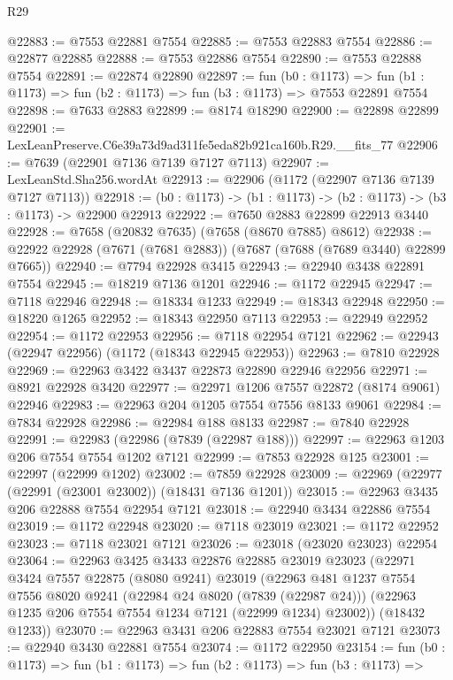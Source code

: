 \begin{lexlean}{R29}
\begin{coremodule}
@22883 := @7553 @22881 @7554
@22885 := @7553 @22883 @7554
@22886 := @22877 @22885
@22888 := @7553 @22886 @7554
@22890 := @7553 @22888 @7554
@22891 := @22874 @22890
@22897 := fun (b0 : @1173) =>
  fun (b1 : @1173) => fun (b2 : @1173) => fun (b3 : @1173) => @7553 @22891 @7554
@22898 := @7633 @2883
@22899 := @8174 @18290
@22900 := @22898 @22899
@22901 := LexLeanPreserve.C6e39a73d9ad311fe5eda82b921ca160b.R29.__fits_77
@22906 := @7639 (@22901 @7136 @7139 @7127 @7113)
@22907 := LexLeanStd.Sha256.wordAt
@22913 := @22906 (@1172 (@22907 @7136 @7139 @7127 @7113))
@22918 := (b0 : @1173) -> (b1 : @1173) -> (b2 : @1173) -> (b3 : @1173) -> @22900 @22913
@22922 := @7650 @2883 @22899 @22913 @3440
@22928 := @7658 (@20832 @7635) (@7658 (@8670 @7885) @8612)
@22938 := @22922 @22928 (@7671 (@7681 @2883)) (@7687 (@7688 (@7689 @3440) @22899 @7665))
@22940 := @7794 @22928 @3415
@22943 := @22940 @3438 @22891 @7554
@22945 := @18219 @7136 @1201
@22946 := @1172 @22945
@22947 := @7118 @22946
@22948 := @18334 @1233
@22949 := @18343 @22948
@22950 := @18220 @1265
@22952 := @18343 @22950 @7113
@22953 := @22949 @22952
@22954 := @1172 @22953
@22956 := @7118 @22954 @7121
@22962 := @22943 (@22947 @22956) (@1172 (@18343 @22945 @22953))
@22963 := @7810 @22928
@22969 := @22963 @3422 @3437 @22873 @22890 @22946 @22956
@22971 := @8921 @22928 @3420
@22977 := @22971 @1206 @7557 @22872 (@8174 @9061) @22946
@22983 := @22963 @204 @1205 @7554 @7556 @8133 @9061
@22984 := @7834 @22928
@22986 := @22984 @188 @8133
@22987 := @7840 @22928
@22991 := @22983 (@22986 (@7839 (@22987 @188)))
@22997 := @22963 @1203 @206 @7554 @7554 @1202 @7121
@22999 := @7853 @22928 @125
@23001 := @22997 (@22999 @1202)
@23002 := @7859 @22928
@23009 := @22969 (@22977 (@22991 (@23001 @23002)) (@18431 @7136 @1201))
@23015 := @22963 @3435 @206 @22888 @7554 @22954 @7121
@23018 := @22940 @3434 @22886 @7554
@23019 := @1172 @22948
@23020 := @7118 @23019
@23021 := @1172 @22952
@23023 := @7118 @23021 @7121
@23026 := @23018 (@23020 @23023) @22954
@23064 := @22963
    @3425
    @3433
    @22876
    @22885
    @23019
    @23023
    (@22971
      @3424
      @7557
      @22875
      (@8080 @9241)
      @23019
      (@22963
        @481
        @1237
        @7554
        @7556
        @8020
        @9241
        (@22984 @24 @8020 (@7839 (@22987 @24)))
        (@22963 @1235 @206 @7554 @7554 @1234 @7121 (@22999 @1234) @23002))
      (@18432 @1233))
@23070 := @22963 @3431 @206 @22883 @7554 @23021 @7121
@23073 := @22940 @3430 @22881 @7554
@23074 := @1172 @22950
@23154 := fun (b0 : @1173) =>
  fun (b1 : @1173) =>
  fun (b2 : @1173) =>
  fun (b3 : @1173) =>

\end{coremodule}
\end{lexlean}
